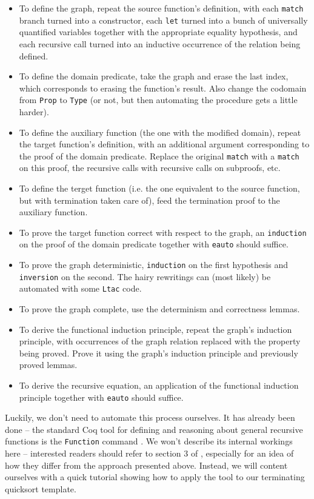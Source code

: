 \documentclass[declaration,mgr,english,shortabstract]{iithesis}
\newcommand{\m}[1]{\texttt{#1}}
\begin{document}
\begin{itemize}
    \item To define the graph, repeat the source function's definition, with each \m{match} branch turned into a constructor, each \m{let} turned into a bunch of universally quantified variables together with the appropriate equality hypothesis, and each recursive call turned into an inductive occurrence of the relation being defined.
    \item To define the domain predicate, take the graph and erase the last index, which corresponds to erasing the function's result. Also change the codomain from \m{Prop} to \m{Type} (or not, but then automating the procedure gets a little harder).
    \item To define the auxiliary function (the one with the modified domain), repeat the target function's definition, with an additional argument corresponding to the proof of the domain predicate. Replace the original \m{match} with a \m{match} on this proof, the recursive calls with recursive calls on subproofs, etc.
    \item To define the terget function (i.e. the one equivalent to the source function, but with termination taken care of), feed the termination proof to the auxiliary function.
    \item To prove the target function correct with respect to the graph, an \m{induction} on the proof of the domain predicate together with \m{eauto} should suffice.
    \item To prove the graph deterministic, \m{induction} on the first hypothesis and \m{inversion} on the second. The hairy rewritings can (most likely) be automated with some \m{Ltac} code.
    \item To prove the graph complete, use the determinism and correctness lemmas.
    \item To derive the functional induction principle, repeat the graph's induction principle, with occurrences of the graph relation replaced with the property being proved. Prove it using the graph's induction principle and previously proved lemmas.
    \item To derive the recursive equation, an application of the functional induction principle together with \m{eauto} should suffice.
\end{itemize}

Luckily, we don't need to automate this process ourselves. It has already been done -- the standard Coq tool for defining and reasoning about general recursive functions is the \m{Function} command \cite{Function} \cite{FunctionRefman}. We won't describe its internal workings here -- interested readers should refer to section 3 of \cite{Function}, especially for an idea of how they differ from the approach presented above. Instead, we will content ourselves with a quick tutorial showing how to apply the tool to our terminating quicksort template.
\end{document}
